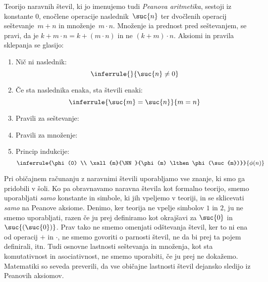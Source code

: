 Teorijo naravnih števil, ki jo imenujemo tudi \emph{Peanova
  aritmetika}, sestoji iz konstante $0$, enočlene operacije
naslednik~$\suc{n}$ ter dvočlenih operacij seštevanje~$m + n$ in
množenje~$m \cdot n$. Množenje ia prednost pred seštevanjem, se pravi,
da je $k + m \cdot n = k + (m \cdot n)$ in ne $(k + m) \cdot n$.
Aksiomi in pravila sklepanja se glasijo:
%
\begin{enumerate}
  \item Nič ni naslednik:
  \begin{equation*}
    \inferrule{ }{\suc{n} \neq 0}    
  \end{equation*}
  \item Če sta naslednika enaka, sta števili enaki:
  \begin{equation*}
    \inferrule{\suc{m} = \suc{n}}{m = n}
  \end{equation*}
  \item Pravili za seštevanje:
  \item Pravili za množenje:
  \item Princip indukcije:
  \begin{equation*}        
    \inferrule{\phi(0) \\ \xall{m}{\NN}{\phi(m) \lthen \phi(\suc{m})}}{\phi(n)}
  \end{equation*}
\end{enumerate}
%
Pri običajnem računanju z naravnimi števili uporabljamo vse znanje, ki
smo ga pridobili v šoli. Ko pa obravnavamo naravna števila kot
formalno teorijo, smemo uporabljati \emph{samo} konstante in simbole,
ki jih vpeljemo v teoriji, in se sklicevati \emph{samo} na Peanove
aksiome. Denimo, ker teorija ne vpelje simbolov $1$ in $2$, ju ne
smemo uporabljati, razen če ju prej definiramo kot okrajšavi za
$\suc{0}$ in $\suc{(\suc{0})}$. Prav tako ne smemo omenjati odštevanja
števil, ker to ni ena od operacij $+$ in $\cdot$, ne smemo govoriti o
parnosti števil, ne da bi prej ta pojem definirali, itn. Tudi osnovne
lastnosti seštevanja in množenja, kot sta komutativnost in
asociativnost, ne smemo uporabiti, če ju prej ne dokažemo. Matematiki
so seveda preverili, da vse običajne lastnosti števil dejansko sledijo
iz Peanovih aksiomov.

